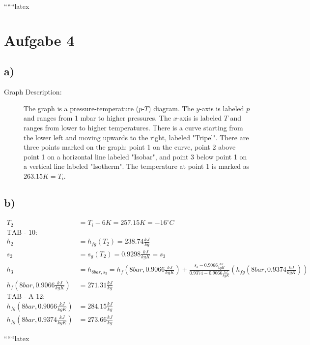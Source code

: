 
``````latex


\section*{Aufgabe 4}

\subsection*{a)}

\begin{description}
    \item[Graph Description:] The graph is a pressure-temperature ($p$-$T$) diagram. The $y$-axis is labeled $p$ and ranges from 1 mbar to higher pressures. The $x$-axis is labeled $T$ and ranges from lower to higher temperatures. There is a curve starting from the lower left and moving upwards to the right, labeled "Tripel". There are three points marked on the graph: point 1 on the curve, point 2 above point 1 on a horizontal line labeled "Isobar", and point 3 below point 1 on a vertical line labeled "Isotherm". The temperature at point 1 is marked as $263.15K = T_i$.
\end{description}

\subsection*{b)}

\begin{align*}
    T_2 &= T_i - 6K = 257.15K = -16^\circ C \\
    \text{TAB - 10:} \\
    h_{2} &= h_{fg}(T_2) = 238.74 \frac{kJ}{kg} \\
    s_{2} &= s_{g}(T_2) = 0.9298 \frac{kJ}{kgK} = s_{3} \\
    h_{3} &= h_{8bar, s_3} = h_{f}(8bar, 0.9066 \frac{kJ}{kgK}) + \frac{s_3 - 0.9066 \frac{kJ}{kgK}}{0.9374 - 0.9066 \frac{kJ}{kgK}} \left( h_{fg}(8bar, 0.9374 \frac{kJ}{kgK}) \right) \\
    h_{f}(8bar, 0.9066 \frac{kJ}{kgK}) &= 271.31 \frac{kJ}{kg} \\
    \text{TAB - A 12:} \\
    h_{fg}(8bar, 0.9066 \frac{kJ}{kgK}) &= 284.15 \frac{kJ}{kg} \\
    h_{fg}(8bar, 0.9374 \frac{kJ}{kgK}) &= 273.66 \frac{kJ}{kg}
\end{align*}

``````latex


